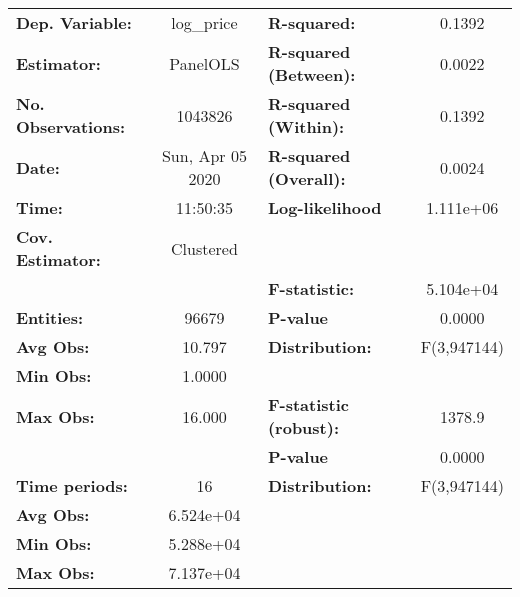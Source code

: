 \documentclass{report}
\begin{document}
\begin{center}
\begin{tabular}{lclc}
\toprule
\textbf{Dep. Variable:}        &     log\_price     & \textbf{  R-squared:         }   &      0.1392      \\
\textbf{Estimator:}            &      PanelOLS      & \textbf{  R-squared (Between):}  &      0.0022      \\
\textbf{No. Observations:}     &      1043826       & \textbf{  R-squared (Within):}   &      0.1392      \\
\textbf{Date:}                 &  Sun, Apr 05 2020  & \textbf{  R-squared (Overall):}  &      0.0024      \\
\textbf{Time:}                 &      11:50:35      & \textbf{  Log-likelihood     }   &    1.111e+06     \\
\textbf{Cov. Estimator:}       &     Clustered      & \textbf{                     }   &                  \\
\textbf{}                      &                    & \textbf{  F-statistic:       }   &    5.104e+04     \\
\textbf{Entities:}             &       96679        & \textbf{  P-value            }   &      0.0000      \\
\textbf{Avg Obs:}              &       10.797       & \textbf{  Distribution:      }   &   F(3,947144)    \\
\textbf{Min Obs:}              &       1.0000       & \textbf{                     }   &                  \\
\textbf{Max Obs:}              &       16.000       & \textbf{  F-statistic (robust):} &      1378.9      \\
\textbf{}                      &                    & \textbf{  P-value            }   &      0.0000      \\
\textbf{Time periods:}         &         16         & \textbf{  Distribution:      }   &   F(3,947144)    \\
\textbf{Avg Obs:}              &     6.524e+04      & \textbf{                     }   &                  \\
\textbf{Min Obs:}              &     5.288e+04      & \textbf{                     }   &                  \\
\textbf{Max Obs:}              &     7.137e+04      & \textbf{                     }   &                  \\
\bottomrule
\end{tabular}
\begin{tabular}{lcccccc}

\end{tabular}
\end{center}
\end{document}

